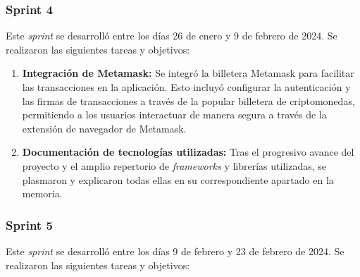 \subsubsection{Sprint 4}

Este \textit{sprint} se desarrolló entre los días 26 de enero y 9 de febrero de 2024. Se realizaron las siguientes tareas y objetivos:

\begin{enumerate}

\item \textbf{Integración de Metamask:} Se integró la billetera Metamask para facilitar las transacciones en la aplicación. Esto incluyó configurar la autenticación y las firmas de transacciones a través de la popular billetera de criptomonedas, permitiendo a los usuarios interactuar de manera segura a través de la extensión de navegador de Metamask.

\item \textbf{Documentación de tecnologías utilizadas:}  Tras el progresivo avance del proyecto y el amplio repertorio de \textit{frameworks} y librerías utilizadas, se plasmaron y explicaron todas ellas en su correspondiente apartado en la memoria.

\end{enumerate}


\subsubsection{Sprint 5}

Este \textit{sprint} se desarrolló entre los días 9 de febrero y 23 de febrero de 2024. Se realizaron las siguientes tareas y objetivos:


